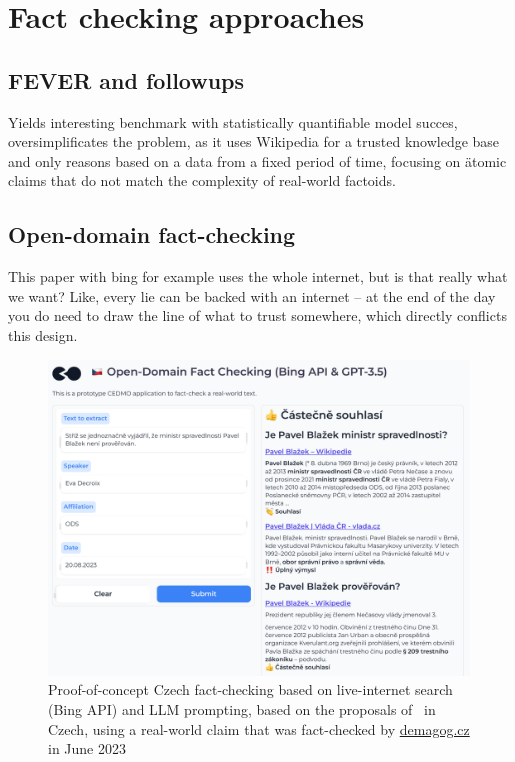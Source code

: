 \section{Fact checking approaches}
\subsection{FEVER and followups}
Yields interesting benchmark with statistically quantifiable model succes, oversimplificates the problem, as it uses Wikipedia for a trusted knowledge base and only reasons based on a data from a fixed period of time, focusing on \"{atomic} claims that do not match the complexity of real-world factoids.
\subsection{Open-domain fact-checking}
This paper with bing for example uses the whole internet, but is that really what we want? Like, every lie can be backed with an internet -- at the end of the day you do need to draw the line of what to trust somewhere, which directly conflicts this design.


\begin{figure}
    \includegraphics[width=14cm]{fig/bing.pdf}
    \caption{Proof-of-concept Czech fact-checking based on live-internet search (Bing API) and LLM prompting, based on the proposals of~\cite{bing} in Czech, using a real-world claim that was fact-checked by \href{https://demagog.cz/vyrok/22849}{\url{demagog.cz}} in June 2023}
    \label{fig:bing}
\end{figure}


